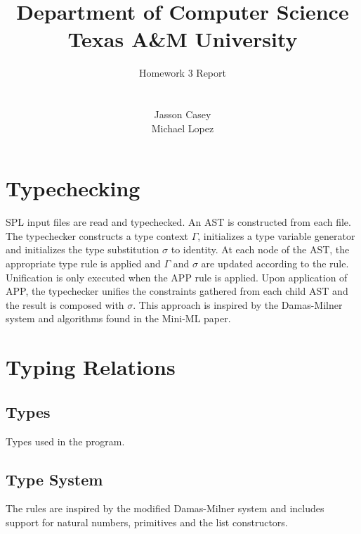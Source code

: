 \documentclass{article}
\title{
Department of Computer Science \\Texas A\&M University}
\author{\LARGE Homework 3 Report\\ \\
\\Jasson Casey
\\Michael Lopez }
\begin{document}
\maketitle

\section{Typechecking}
SPL input files are read and typechecked. An AST is constructed from each file. The typechecker constructs a type context $\Gamma$, initializes a type variable generator and initializes the type substitution $\sigma$ to identity. At each node of the AST, the appropriate type rule is applied and $\Gamma$ and $\sigma$ are updated according to the rule. Unification is only executed when the APP rule is applied. Upon application of APP, the typechecker unifies the constraints gathered from each child AST and the result is composed with $\sigma$. This approach is inspired by the Damas-Milner system and algorithms found in the Mini-ML paper.


\section{Typing Relations}
\subsection{Types}
Types used in the program.

\subsection{Type System}
The rules are inspired by the modified Damas-Milner system and includes support for natural numbers, primitives and the list constructors.
\end{document}
